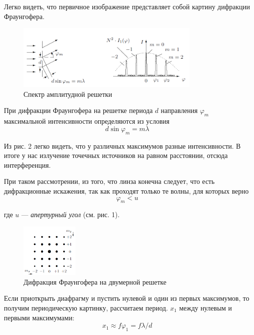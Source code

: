 \documentclass[a4paper,12pt]{article}
\begin{document}
	Легко видеть, что первичное изображение представляет собой картину дифракции Фраунгофера. 
	
	\begin{figure}[h]
		\begin{center}
			\includegraphics[width = 0.8\textwidth]{433-2.png}
			\caption{Спектр амплитудной решетки}
		\end{center}
	\end{figure}
	При дифракции Фраунгофера на решетке периода $d$ направления $\varphi_m$ максимальной интенсивности определяются из условия 
	\begin{equation}
	d \sin \varphi_m = m \lambda
	\end{equation}
	
	Из рис. 2 легко видеть, что у различных максимумов разные интенсивности.
	В итоге у нас излучение точечных источников на равном расстоянии, отсюда интерференция. 
	
	При таком рассмотрении, из того, что линза конечна следует, что есть дифракционные искажения, так как проходят только те волны, для которых верно 
	\begin{equation}
	\varphi_m < u
	\end{equation}
	
	где $u$ --- \textit{апертурный угол} (см. рис. 1).
	
	\begin{figure}
		\begin{center}
			\includegraphics[width = 0.25\textwidth]{433-3.png}
		\end{center}
		\caption{Дифракция Фраунгофера на двумерной решетке}
	\end{figure}
	
	Если приоткрыть диафрагму и пустить нулевой и один из первых максимумов, то получим периодическую картинку, рассчитаем период. $x_1$ между нулевым и первыми максимумами:
	\begin{equation}
	x_1 \approx f \varphi_1 = f \lambda/d
	\end{equation} 
	
\end{document}
